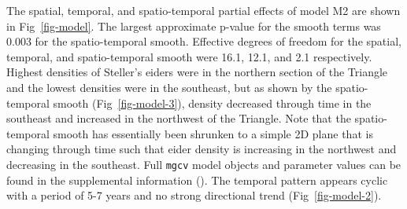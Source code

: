 \documentclass[
  10pt,
  letterpaper,
]{article}
\begin{document}
\begin{table}

\caption{\label{tbl-modelsTri}AIC table for models fit to Triangle data.
Model structures are described in the main text.}


\end{table}%

The spatial, temporal, and spatio-temporal partial effects of model M2
are shown in Fig~\ref{fig-model}. The largest approximate p-value for
the smooth terms was 0.003 for the spatio-temporal smooth. Effective
degrees of freedom for the spatial, temporal, and spatio-temporal smooth
were 16.1, 12.1, and 2.1 respectively. Highest densities of Steller's
eiders were in the northern section of the Triangle and the lowest
densities were in the southeast, but as shown by the spatio-temporal
smooth (Fig~\ref{fig-model-3}), density decreased through time in the
southeast and increased in the northwest of the Triangle. Note that the
spatio-temporal smooth has essentially been shrunken to a simple 2D
plane that is changing through time such that eider density is
increasing in the northwest and decreasing in the southeast. Full
\texttt{mgcv} model objects and parameter values can be found in the
supplemental information (). The temporal pattern
appears cyclic with a period of 5-7 years and no strong directional
trend (Fig~\ref{fig-model-2}).
\end{document}
